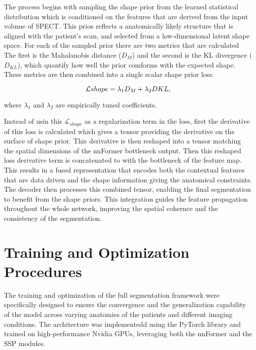 The process begins with sampling the shape prior from the learned statistical distribution which is conditioned on the features that are derived from the input volume of SPECT. This prios reflects a anatomically likely structure that is aligned with the patient's scan, and selected from a low-dimensional latent shape space. For each of the sampled prior there are two metrics that are calculated The first is the Mahalanobis distance ($D_M$) and the second is the KL divergence ($D_{KL}$), which quantify how well the prior comforms with the expected shape. These metrics are then combined into a single scalar shape prior loss:

\begin{equation}
\addcontentsline{equ}{equations}{\protect\numberline{\theequation}Combined Shape Loss} 
    \mathcal{L}{shape} = \lambda_1 D_M + \lambda_2 D{KL}, 
\end{equation}

where $\lambda_1$ and $\lambda_2$ are empirically tuned coefficients.

Instead of usin this $\mathcal{L}_{shape}$ as a regularization term in the loss, first the derivative of this loss is calculated which gives a tensor providing the derivative on the surface of shape prior. This derivative is then reshaped into a tensor matching the spatial dimensions of the nnFormer bottleneck output. Then this reshaped loss derivative term is concatenated to with the bottleneck of the feature map. This results in a fused representation that encodes both the contextual features that are data driven and the shape information giving the anatomical constraints. The decoder then processes this combined tensor, enabling the final segmentation to benefit from the shape priors. This integration guides the feature propagation throughout the whole network, improving the spatial cohernce and the consistency of the segmentation.


\section{Training and Optimization Procedures}
The training and optimization of the full segmentation framework were specifically designed to ensure the convergence and the generalization capability of the model across varying anatomies of the patients and different imaging conditions. The architecture was implementedd using the PyTorch library and trained on high-performance Nvidia GPUs, leveraging both the nnFormer and the SSP modules.

